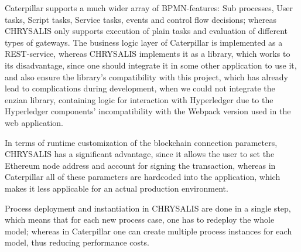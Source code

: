 Caterpillar supports a much wider array of BPMN-features: Sub processes, User tasks, Script tasks, Service tasks, events and control flow decisions; whereas CHRYSALIS only supports execution of plain tasks and evaluation of different types of gateways. The business logic layer of Caterpillar is implemented as a REST-service, whereas CHRYSALIS implements it as a library, which works to its disadvantage, since one should integrate it in some other application to use it, and also ensure the library's compatibility with this project, which has already lead to complications during development, when we could not integrate the enzian library, containing logic for interaction with Hyperledger due to the Hyperledger components' incompatibility with the Webpack version used in the web application.

In terms of runtime customization of the blockchain connection parameters, CHRYSALIS has a significant advantage, since it allows the user to set the Ethereum node address and account for signing the transaction, whereas in Caterpillar all of these parameters are hardcoded into the application, which makes it less applicable for an actual production environment.

Process deployment and instantiation in CHRYSALIS are done in a single step, which means that for each new process case, one has to redeploy the whole model; whereas in Caterpillar one can create multiple process instances for each model, thus reducing performance costs.

